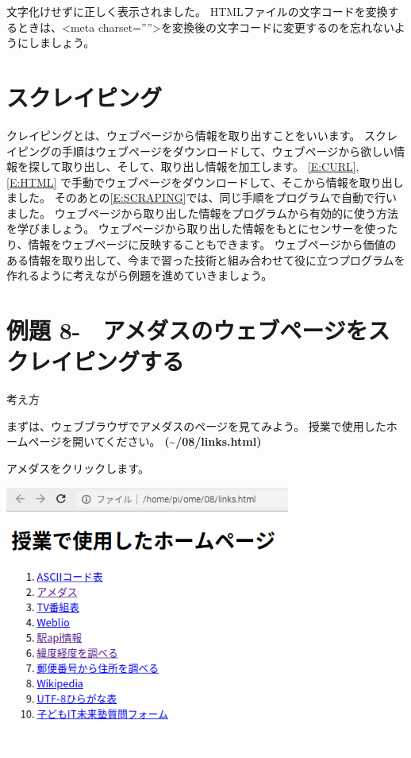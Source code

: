 \documentclass[a4paper,12pt,dvipdfmx]{jarticle}
\newcounter{Exercise}
\renewcommand\theExercise{例題 8-\arabic{Exercise}}
\begin{document}
\bigskip


\bigskip

文字化けせずに正しく表示されました。
HTMLファイルの文字コードを変換するときは、{\textless}meta
charset=””{\textgreater}を変換後の文字コードに変更するのを忘れないようにしましょう。

\clearpage\section{スクレイピング}
クレイピングとは、ウェブページから情報を取り出すことをいいます。
スクレイピングの手順はウェブページをダウンロードして、ウェブページから欲しい情報を探して取り出し、そして、取り出し情報を加工します。
\ref*{E:CURL},\ref*{E:HTML}
で手動でウェブページをダウンロードして、そこから情報を取り出しました。
そのあとの\ref*{E:SCRAPING}では、同じ手順をプログラムで自動で行いました。
ウェブページから取り出した情報をプログラムから有効的に使う方法を学びましょう。
ウェブページから取り出した情報をもとにセンサーを使ったり、情報をウェブページに反映することもできます。
ウェブページから価値のある情報を取り出して、今まで習った技術と組み合わせて役に立つプログラムを作れるように考えながら例題を進めていきましょう。



\bigskip
{}
\clearpage\section{\theExercise　アメダスのウェブページをスクレイピングする}
考え方

まずは、ウェブブラウザでアメダスのページを見てみよう。
授業で使用したホームページを開いてください。
\textbf{(\~{}/08/links.html)}

アメダスをクリックします。 



\begin{center}
\includegraphics[width=9.398cm,height=8.784cm]{textbook-img017.png}

\end{center}
\end{document}
